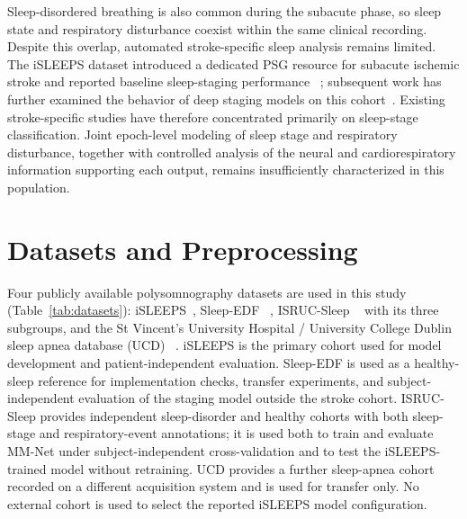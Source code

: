 \documentclass[a4paper,fleqn]{cas-sc}
\begin{document}
Sleep-disordered breathing is also common during the subacute phase, so sleep
state and respiratory disturbance coexist within the same clinical recording.
Despite this overlap, automated stroke-specific sleep analysis remains limited.
The iSLEEPS dataset introduced a dedicated PSG resource for subacute ischemic
stroke and reported baseline sleep-staging performance
~\cite{maiti2026isleeps}; subsequent work has further examined the behavior of
deep staging models on this cohort~\cite{bose2026gap}. Existing stroke-specific
studies have therefore concentrated primarily on sleep-stage classification.
Joint epoch-level modeling of sleep stage and respiratory disturbance, together
with controlled analysis of the neural and cardiorespiratory information
supporting each output, remains insufficiently characterized in this
population.

\section{Datasets and Preprocessing}
\label{sec:data}

Four publicly available polysomnography datasets are used in this study (Table~\ref{tab:datasets}):
iSLEEPS~\cite{maiti2026isleeps}, Sleep-EDF
~\cite{kemp2000sleepedf,goldberger2000physionet}, ISRUC-Sleep
~\cite{khalighi2016isruc} with its three subgroups, and the St Vincent's
University Hospital / University College Dublin sleep apnea database (UCD)
~\cite{ucddb2007}. iSLEEPS is the primary cohort used for model development and
patient-independent evaluation. Sleep-EDF is used as a healthy-sleep reference
for implementation checks, transfer experiments, and subject-independent
evaluation of the staging model outside the stroke cohort. ISRUC-Sleep provides
independent sleep-disorder and healthy cohorts with both sleep-stage and
respiratory-event annotations; it is used both to train and evaluate MM-Net
under subject-independent cross-validation and to test the iSLEEPS-trained model
without retraining. UCD provides a further sleep-apnea cohort recorded on a
different acquisition system and is used for transfer only. No external cohort is
used to select the reported iSLEEPS model configuration.
\end{document}
